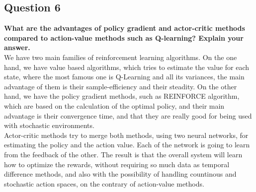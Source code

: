\documentclass[12pt]{article}
\begin{document}
\subsection{Question 6}
\textbf{What are the advantages of policy gradient and actor-critic methods compared to action-value methods such as Q-learning? Explain your answer.}\\

We have two main families of reinforcement learning algorithms. On the one hand, we have value based algorithms, which tries to estimate the value for each state, where the most famous one is Q-Learning and all its variances, the main advantage of them is their sample-efficiency and their steadity. On the other hand, we have the policy gradient methods, such as REINFORCE algorithm, which are based on the calculation of the optimal policy, and their main advantage is their convergence time, and that they are really good for being used with stochastic environments.\\

Actor-critic methods try to merge both methods, using two neural networks, for estimating the policy and the action value. Each of the network is going to learn from the feedback of the other. The result is that the overall system will learn how to optimize the rewards, without requiring so much data as temporal difference methods, and also with the possibility of handling countinous and stochastic action spaces, on the contrary of action-value methods.
\end{document}
